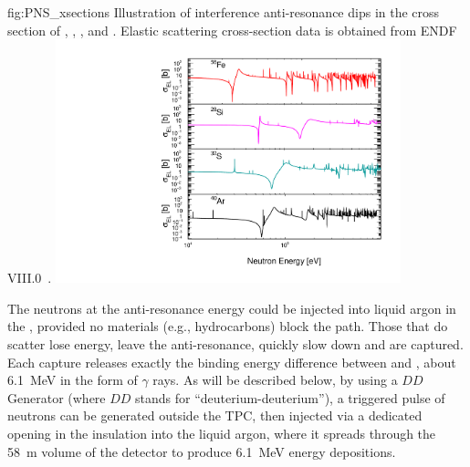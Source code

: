 \begin{dunefigure}{fig:PNS_xsections}
{Illustration of interference anti-resonance dips in the cross section of , , , and . Elastic scattering cross-section data is obtained from ENDF VIII.0~\cite{Brown:2018jhj}.}
\includegraphics[width=10cm]{graphics/PNS_xsection.pdf}
\end{dunefigure}

The neutrons at the anti-resonance energy could be injected into liquid argon in the , provided no materials (e.g., hydrocarbons) block the path. Those that do scatter lose energy, leave the anti-resonance, quickly slow down and are captured. Each capture releases exactly the binding energy difference between  and , about \SI{6.1}{\MeV} in the form of $\gamma$ rays.  As will be described below, by using a $DD$ Generator (where $DD$ stands for ``deuterium-deuterium''), a triggered pulse of neutrons can be generated outside the TPC, then injected via a dedicated opening in the insulation into the liquid argon, where it spreads through the \SI{58}{\m} volume of the detector to produce \SI{6.1}{\MeV} energy depositions.

